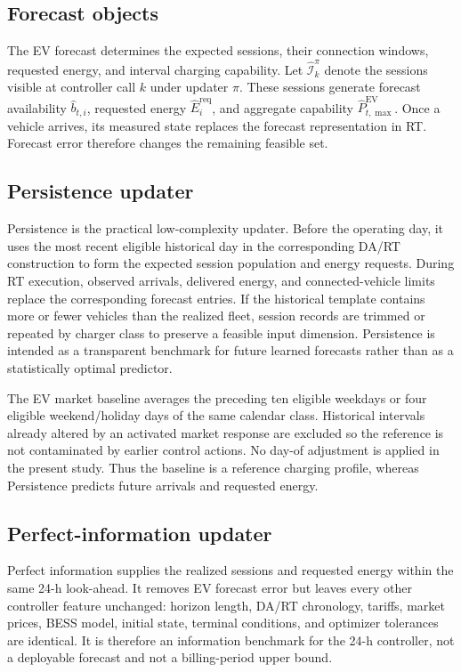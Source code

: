 \documentclass[final,5p,times]{elsarticle}
\newcommand{\EV}{\mathrm{EV}}
\newcommand{\req}{\mathrm{req}}
\begin{document}
\subsection{Forecast objects}
The EV forecast determines the expected sessions, their connection windows, requested energy, and interval charging capability. Let $\widehat{\mathcal I}_{k}^{\pi}$ denote the sessions visible at controller call $k$ under updater $\pi$. These sessions generate forecast availability $\widehat b_{t,i}$, requested energy $\widehat E_i^{\req}$, and aggregate capability $\widehat P_{t,\max}^{\EV}$. Once a vehicle arrives, its measured state replaces the forecast representation in RT. Forecast error therefore changes the remaining feasible set.

\subsection{Persistence updater}
Persistence is the practical low-complexity updater. Before the operating day, it uses the most recent eligible historical day in the corresponding DA/RT construction to form the expected session population and energy requests. During RT execution, observed arrivals, delivered energy, and connected-vehicle limits replace the corresponding forecast entries. If the historical template contains more or fewer vehicles than the realized fleet, session records are trimmed or repeated by charger class to preserve a feasible input dimension. Persistence is intended as a transparent benchmark for future learned forecasts rather than as a statistically optimal predictor.

The EV market baseline averages the preceding ten eligible weekdays or four eligible weekend/holiday days of the same calendar class. Historical intervals already altered by an activated market response are excluded so the reference is not contaminated by earlier control actions. No day-of adjustment is applied in the present study. Thus the baseline is a reference charging profile, whereas Persistence predicts future arrivals and requested energy.

\subsection{Perfect-information updater}
Perfect information supplies the realized sessions and requested energy within the same 24-h look-ahead. It removes EV forecast error but leaves every other controller feature unchanged: horizon length, DA/RT chronology, tariffs, market prices, BESS model, initial state, terminal conditions, and optimizer tolerances are identical. It is therefore an information benchmark for the 24-h controller, not a deployable forecast and not a billing-period upper bound.
\end{document}
